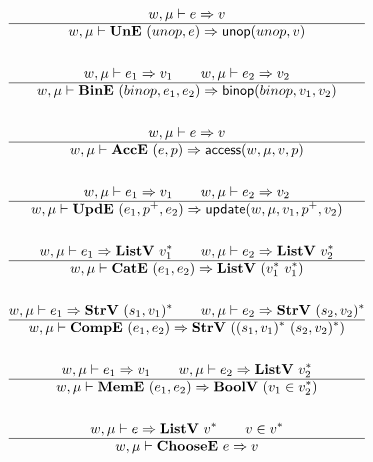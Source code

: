 \begin{gather*}
  w, \mu \vdash e \Rightarrow v \\
  \hline
  w, \mu \vdash \une ~ (unop, e) \Rightarrow \unop(unop, v) \\
%
\newline \\
  w, \mu \vdash e_1 \Rightarrow v_1 \qquad w, \mu \vdash e_2 \Rightarrow v_2 \\
  \hline
  w, \mu \vdash \bine ~ (binop, e_1, e_2) \Rightarrow \binop(binop, v_1, v_2) \\
%
\newline \\
  w, \mu \vdash e \Rightarrow v \\
  \hline
  w, \mu \vdash \acce ~ (e, p) \Rightarrow \access(w, \mu, v, p) \\
%
\newline \\
  w, \mu \vdash e_1 \Rightarrow v_1 \qquad w, \mu \vdash e_2 \Rightarrow v_2 \\
  \hline
  w, \mu \vdash \upde ~ (e_1, p^+, e_2) \Rightarrow \update(w, \mu, v_1, p^+, v_2) \\
%
\newline \\
   w, \mu \vdash e_1 \Rightarrow \listv ~ \seq{v_1} \qquad
   w, \mu \vdash e_2 \Rightarrow \listv ~ \seq{v_2} \\
  \hline
  w, \mu \vdash \cate ~ (e_1, e_2) \Rightarrow \listv ~ (\seq{v_1} ~ \seq{v_1}) \\
%
\newline \\
   w, \mu \vdash e_1 \Rightarrow \strv ~ \seq{(s_1, v_1)} \qquad
   w, \mu \vdash e_2 \Rightarrow \strv ~ \seq{(s_2, v_2)} \\
  \hline
  w, \mu \vdash \compe ~ (e_1, e_2) \Rightarrow \strv ~ (\seq{(s_1, v_1)} ~ \seq{(s_2, v_2)}) \\
%
\newline \\
  w, \mu \vdash e_1 \Rightarrow v_1 \qquad
  w, \mu \vdash e_2 \Rightarrow \listv ~ \seq{v_2} \\
  \hline
  w, \mu \vdash \meme ~ (e_1, e_2) \Rightarrow \boolv ~ (v_1 \in \seq{v_2}) \\
%
\newline \\
  w, \mu \vdash e \Rightarrow \listv ~ \seq{v} \qquad
  v \in \seq{v} \\
  \hline
  w, \mu \vdash \choosee ~ e \Rightarrow v \\

\end{gather*}
